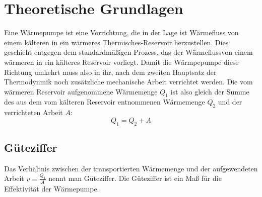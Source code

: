 \section{Theoretische Grundlagen}

Eine Wärmepumpe ist eine Vorrichtung, die in der Lage ist Wärmefluss von einem kälteren in ein
wärmeres Thermisches-Reservoir herzustellen. Dies geschieht entgegen dem standardmäßigen Prozess,
das der Wärmeflussvon einem wärmeren in ein 
kälteres Reservoir vorliegt. Damit die Wärmpepumpe diese Richtung umkehrt muss also in ihr,
nach dem zweiten Hauptsatz der Thermodynmik noch zusätzliche
mechanische Arbeit verrichtet werden.
Die vom wärmeren Reservoir aufgenommene Wärmemenge $Q_1$ ist also gleich der
Summe des aus dem vom kälteren Reservoir entnommenen Wärmemenge $Q_2$ und der verrichteten Arbeit $A$:
\begin{equation}
  Q_1 = Q_2 + A  
\end{equation}

\subsection{Güteziffer}

Das Verhältnis zwischen der transportierten Wärmemenge und der 
aufgewendeten Arbeit $v=\frac{Q_1}{A}$ nennt man Güteziffer.
Die Güteziffer ist ein Maß für die Effektivität der Wärmepumpe.




